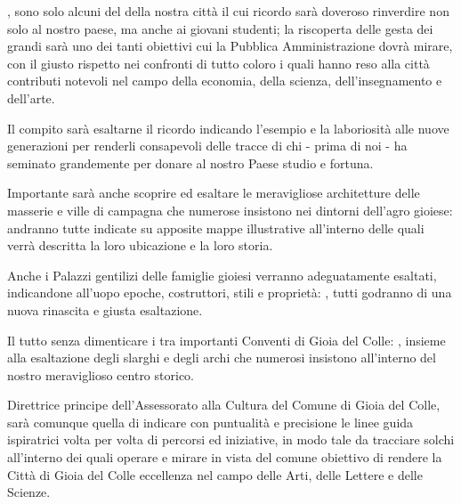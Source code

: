 \documentclass[a4paper,14pt,italian]{sphinxmanual}
\begin{document}
 , sono solo alcuni del  della nostra città il cui ricordo sarà doveroso rinverdire non solo al nostro paese, ma anche ai giovani studenti;
la riscoperta delle gesta dei grandi sarà uno dei tanti obiettivi cui la Pubblica Amministrazione dovrà mirare, con il giusto rispetto nei confronti di tutto coloro i quali hanno reso alla città contributi notevoli nel campo della economia, della scienza, dell’insegnamento e dell’arte.

Il compito sarà esaltarne il ricordo indicando l’esempio e la laboriosità alle nuove generazioni per renderli consapevoli delle tracce di chi - prima di noi - ha seminato grandemente per donare al nostro Paese studio e fortuna.

Importante sarà anche scoprire ed esaltare le meravigliose architetture delle masserie e ville di campagna che numerose insistono nei dintorni dell’agro gioiese:  andranno tutte indicate su apposite mappe illustrative all’interno delle quali verrà descritta la loro ubicazione e la loro storia.

Anche i Palazzi gentilizi delle famiglie gioiesi verranno adeguatamente esaltati, indicandone all’uopo epoche, costruttori, stili e proprietà: , tutti godranno di una nuova rinascita e giusta esaltazione.

Il tutto senza dimenticare i tra importanti Conventi di Gioia del Colle: , insieme alla esaltazione degli slarghi e degli archi che numerosi insistono all’interno del nostro meraviglioso centro storico.

Direttrice principe dell’Assessorato alla Cultura del Comune di Gioia del Colle, sarà comunque quella di indicare con puntualità e precisione le linee guida ispiratrici volta per volta di percorsi ed iniziative, in modo tale da tracciare solchi all’interno dei quali operare e mirare in vista del comune obiettivo di rendere la Città di Gioia del Colle eccellenza nel campo delle Arti, delle Lettere e delle Scienze.
\end{document}
